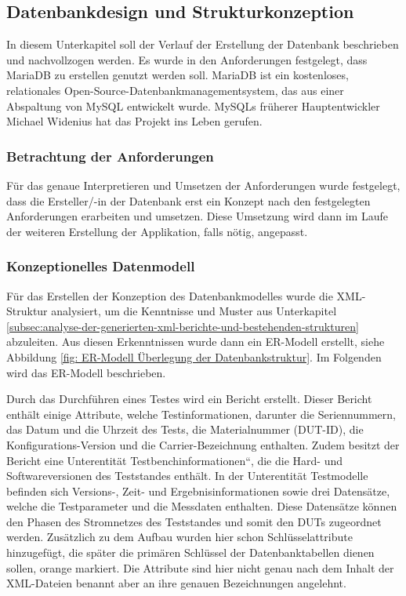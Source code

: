 \subsection{Datenbankdesign und Strukturkonzeption}
\label{subsec:datenbankdesign-und-strukturkonzeption}

In diesem Unterkapitel soll der Verlauf der Erstellung der Datenbank beschrieben und nachvollzogen werden. Es wurde in
den Anforderungen festgelegt, dass MariaDB zu erstellen genutzt werden soll. MariaDB ist ein kostenloses, relationales
Open-Source-Datenbankmanagementsystem, das aus einer Abspaltung von MySQL entwickelt wurde. MySQLs früherer
Hauptentwickler Michael Widenius hat das Projekt ins Leben gerufen.\cite{mariadb.org}

\subsubsection{Betrachtung der Anforderungen}

Für das genaue Interpretieren und Umsetzen der Anforderungen wurde festgelegt, dass die Ersteller/-in der Datenbank erst
ein Konzept nach den festgelegten Anforderungen erarbeiten und umsetzen.
Diese Umsetzung wird dann im Laufe der weiteren Erstellung der Applikation, falls nötig, angepasst.

\subsubsection{Konzeptionelles Datenmodell}

Für das Erstellen der Konzeption des Datenbankmodelles wurde die XML-Struktur analysiert, um die Kenntnisse und Muster
aus Unterkapitel \ref{subsec:analyse-der-generierten-xml-berichte-und-bestehenden-strukturen} abzuleiten.
Aus diesen Erkenntnissen wurde dann ein ER-Modell erstellt, siehe Abbildung \ref{fig: ER-Modell Überlegung der Datenbankstruktur}.
Im Folgenden wird das ER-Modell beschrieben.

Durch das Durchführen eines Testes wird ein Bericht erstellt. Dieser Bericht enthält einige Attribute, welche
Testinformationen, darunter die Seriennummern, das Datum und die Uhrzeit des Tests, die Materialnummer (DUT-ID), die
Konfigurations-Version und die Carrier-Bezeichnung enthalten. Zudem besitzt der Bericht eine Unterentität
Testbenchinformationen“, die die Hard- und Softwareversionen des Teststandes enthält. In der Unterentität Testmodelle
befinden sich Versions-, Zeit- und Ergebnisinformationen sowie drei Datensätze, welche die Testparameter und die Messdaten
enthalten. Diese Datensätze können den Phasen des Stromnetzes des Teststandes und somit den DUTs zugeordnet werden.
Zusätzlich zu dem Aufbau wurden hier schon Schlüsselattribute hinzugefügt, die später die primären Schlüssel der
Datenbanktabellen dienen sollen, orange markiert. Die Attribute sind hier nicht genau nach dem Inhalt der XML-Dateien
benannt aber an ihre genauen Bezeichnungen angelehnt.

